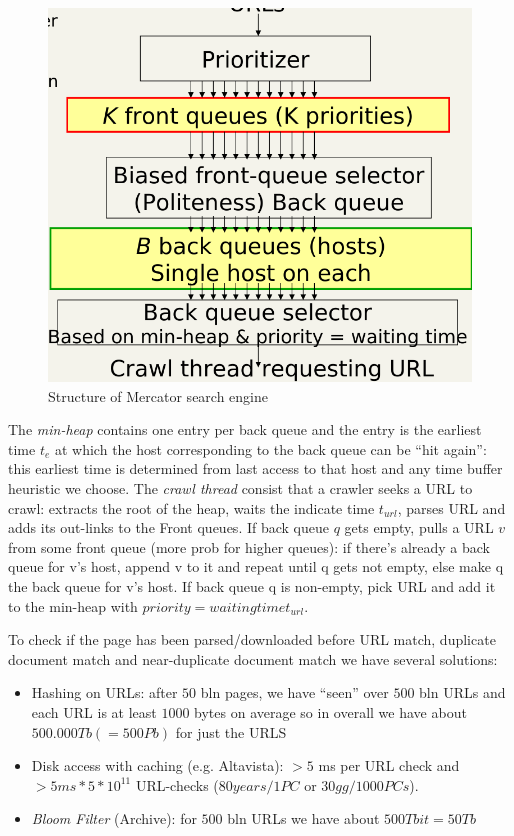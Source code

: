 \begin{figure}
    \caption{Structure of Mercator search engine}
    \label{img:mercator}
    \includegraphics[width=\textwidth]{Images/mercator}
\end{figure}
The \emph{min-heap} contains one entry per back queue and the entry is the earliest time $t_e$ at which the host corresponding to the back queue can be “hit again”:
this earliest time is determined from last access to that host and any time buffer heuristic we choose.\newline
The \emph{crawl thread} consist that a crawler seeks a URL to crawl: extracts the root of the heap, waits the indicate time $t_{url}$, parses URL and adds its out-links to the Front queues.\newline
If back queue $q$ gets empty, pulls a URL $v$ from some front queue (more prob for higher queues): if there’s already a back queue for v’s host, append v to it and 
repeat until q gets not empty, else make q the back queue for v’s host.\newline
If back queue q is non-empty, pick URL and add it to the min-heap with $priority = waiting time t_{url}$.

To check if the page has been parsed/downloaded before URL match, duplicate document match and near-duplicate document match we have several solutions:
\begin{itemize}
    \item Hashing on URLs: after $50$ bln pages, we have “seen” over $500$ bln URLs and each URL is at least $1000$ bytes on average so in overall we have about $500.000 Tb (=500 Pb)$ for just the URLS
    \item Disk access with caching (e.g. Altavista): $>5$ ms per URL check and $>5 ms * 5 * 10^{11}$ URL-checks ($80 years/1PC$ or $30gg/1000 PCs$).
    \item \emph{Bloom Filter} (Archive): for $500$ bln URLs we have about $500 Tbit = 50Tb$
\end{itemize}

